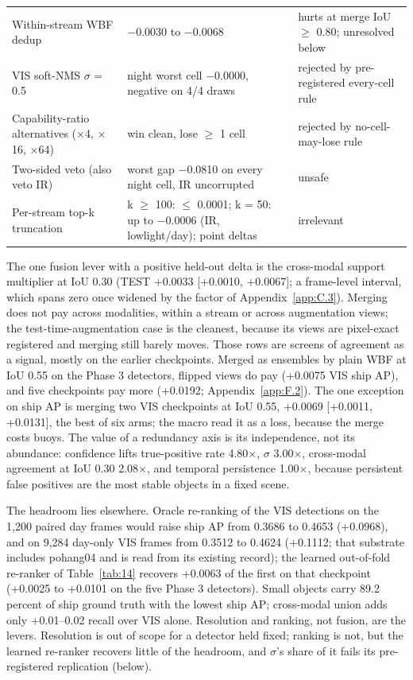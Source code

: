 \documentclass[10pt]{article}
\begin{document}
\begin{table}[htbp]
\begin{tabularx}{\linewidth}{>{\raggedright\arraybackslash}X>{\raggedright\arraybackslash}X>{\raggedright\arraybackslash}X}
Within-stream WBF dedup \textdagger{} & $-$0.0030 to $-$0.0068 & hurts at merge IoU $\geq$ 0.80; unresolved below \\
VIS soft-NMS $\sigma$ = 0.5 \textdaggerdbl{} & night worst cell $-$0.0000, negative on 4/4 draws & rejected by pre-registered every-cell rule \\
Capability-ratio alternatives ($\times$4, $\times$16, $\times$64) & win clean, lose $\geq$ 1 cell & rejected by no-cell-may-lose rule \\
Two-sided veto (also veto IR) & worst gap $-$0.0810 on every night cell, IR uncorrupted & unsafe \\
Per-stream top-k truncation \textdagger{} & k $\geq$ 100: $\leq$ 0.0001; k = 50: up to $-$0.0006 (IR, lowlight/day); point deltas & irrelevant \\
\bottomrule
\end{tabularx}
\end{table}
The one fusion lever with a positive held-out delta is the cross-modal support multiplier at IoU 0.30 (TEST +0.0033 [+0.0010, +0.0067]; a frame-level interval, which spans zero once widened by the factor of Appendix~\ref{app:C.3}). Merging does not pay across modalities, within a stream or across augmentation views; the test-time-augmentation case is the cleanest, because its views are pixel-exact registered and merging still barely moves. Those rows are screens of agreement as a signal, mostly on the earlier checkpoints. Merged as ensembles by plain WBF at IoU 0.55 on the Phase 3 detectors, flipped views do pay (+0.0075 VIS ship AP), and five checkpoints pay more (+0.0192; Appendix~\ref{app:F.2}). The one exception on ship AP is merging two VIS checkpoints at IoU 0.55, +0.0069 [+0.0011, +0.0131], the best of six arms; the macro read it as a loss, because the merge costs buoys. The value of a redundancy axis is its independence, not its abundance: confidence lifts true-positive rate 4.80$\times$, $\sigma$ 3.00$\times$, cross-modal agreement at IoU 0.30 2.08$\times$, and temporal persistence 1.00$\times$, because persistent false positives are the most stable objects in a fixed scene.

The headroom lies elsewhere. Oracle re-ranking of the VIS detections on the 1,200 paired day frames would raise ship AP from 0.3686 to 0.4653 (+0.0968), and on 9,284 day-only VIS frames from 0.3512 to 0.4624 (+0.1112; that substrate includes pohang04 and is read from its existing record); the learned out-of-fold re-ranker of Table~\ref{tab:14} recovers +0.0063 of the first on that checkpoint (+0.0025 to +0.0101 on the five Phase 3 detectors). Small objects carry 89.2 percent of ship ground truth with the lowest ship AP; cross-modal union adds only +0.01--0.02 recall over VIS alone. Resolution and ranking, not fusion, are the levers. Resolution is out of scope for a detector held fixed; ranking is not, but the learned re-ranker recovers little of the headroom, and $\sigma$'s share of it fails its pre-registered replication (below).
\end{document}
